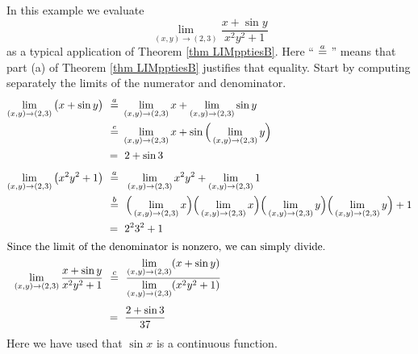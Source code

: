 \begin{eg}\label{eg LIMtwodA}
In this example we evaluate
\begin{equation*}
\lim_{(x,y)\rightarrow (2,3)} \frac{x+\sin y}{x^2y^2+1}
\end{equation*}
as a typical application of Theorem \ref{thm LIMpptiesB}. 
Here ``$\eqover{a}$'' means that part (a) of Theorem \ref{thm LIMpptiesB}
justifies that equality. Start by computing separately the limits of 
the numerator and denominator. 
\begin{align*}
\lim_{(x,y)\rightarrow (2,3)} \big(x+\sin y\big)\ 
  &\eqover{a} \lim_{(x,y)\rightarrow (2,3)} x
                +\lim_{(x,y)\rightarrow (2,3)}\sin y \\
  &\eqover{e} \lim_{(x,y)\rightarrow (2,3)} x
                +\sin\Big(\lim_{(x,y)\rightarrow (2,3)} y\Big) \\
  &=\  2+\sin 3\\[0.05in]
\lim_{(x,y)\rightarrow (2,3)} \big(x^2y^2+1\big)\ 
  &\eqover{a}\  \lim_{(x,y)\rightarrow (2,3)} x^2y^2
                +\lim_{(x,y)\rightarrow (2,3)}1 \\
  &\eqover{b}\  \Big(\lim_{(x,y)\rightarrow (2,3)} x\Big)
              \Big(\lim_{(x,y)\rightarrow (2,3)} x\Big)
               \Big(\lim_{(x,y)\rightarrow (2,3)} y\Big)
              \Big(\lim_{(x,y)\rightarrow (2,3)} y\Big)+1 \\
  &=\  2^23^2+1\\
\intertext{Since the limit of the denominator is nonzero, we can simply divide.}
\lim_{(x,y)\rightarrow (2,3)} \frac{x+\sin y}{x^2y^2+1}\ 
&\eqover{c}\ \frac
              {\lim\limits_{(x,y)\rightarrow (2,3)}(x+\sin y)}
                 {\lim\limits_{(x,y)\rightarrow (2,3)}(x^2y^2+1)}\\[0.05in]
&=\ \frac{2+\sin 3}{37}
\end{align*}
Here we have used that $\sin x$ is a continuous function.
\end{eg}


